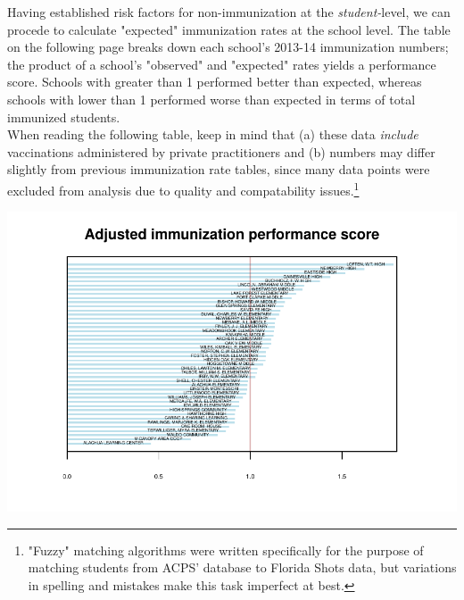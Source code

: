 \documentclass{article}
\begin{document}
\begin{multicols}{2}
\begin{multicols}{2}
Having established risk factors for non-immunization at the \emph{student-}level, we can procede to calculate "expected" immunization rates at the school level.  The table on the following page breaks down each school's 2013-14 immunization numbers; the product of a school's "observed" and "expected" rates yields a performance score.  Schools with greater than 1 performed better than expected, whereas schools with lower than 1 performed worse than expected in terms of total immunized students.  \\

When reading the following table, keep in mind that (a) these data \emph{include} vaccinations administered by private practitioners and (b) numbers may differ slightly from previous immunization rate tables, since many data points were excluded from analysis due to quality and compatability issues.\footnote{"Fuzzy" matching algorithms were written specifically for the purpose of matching students from ACPS' database to Florida Shots data, but variations in spelling and mistakes make this task imperfect at best.}



\end{multicols}

\includegraphics{superintendent-011}



\end{multicols}
\end{document}
